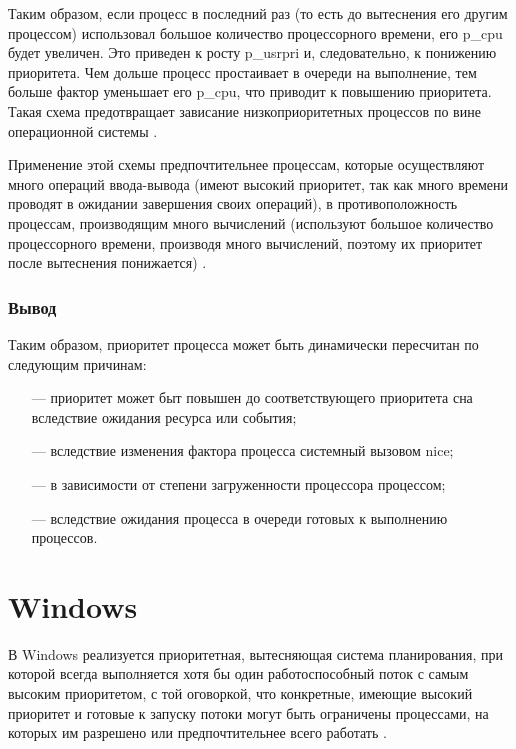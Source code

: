 Таким образом, если процесс в последний раз (то есть до вытеснения его другим процессом) использовал большое количество процессорного времени, его {\ttfamily p\_cpu} будет увеличен. Это приведен к росту {\ttfamily p\_usrpri} и, следовательно, к понижению приоритета. Чем дольше процесс простаивает в очереди на выполнение, тем больше фактор  уменьшает его {\ttfamily p\_cpu}, что приводит к повышению приоритета. Такая схема предотвращает зависание низкоприоритетных процессов по вине операционной системы \cite{unix5}.

Применение этой схемы предпочтительнее процессам, которые осуществляют много операций ввода-вывода (имеют высокий приоритет, так как много времени проводят в ожидании завершения своих операций), в противоположность процессам, производящим много вычислений (используют большое количество процессорного времени, производя много вычислений, поэтому их приоритет после вытеснения понижается) \cite{unix5}.

\subsubsection*{Вывод}

Таким образом, приоритет процесса может быть динамически пересчитан по следующим причинам:

\begin{itemize}
    \item[---] приоритет может быт повышен до соответствующего приоритета сна вследствие ожидания ресурса или события;
    \item[---] вследствие изменения фактора  процесса системный вызовом {\ttfamily nice};
    \item[---] в зависимости от степени загруженности процессора процессом;
    \item[---] вследствие ожидания процесса в очереди готовых к выполнению процессов.
\end{itemize}



\section{Windows}

В Windows реализуется приоритетная, вытесняющая система планирования, при которой всегда выполняется хотя бы один работоспособный поток с самым высоким приоритетом, с той оговоркой, что конкретные, имеющие высокий приоритет и готовые к запуску потоки могут быть ограничены процессами, на которых им разрешено или предпочтительнее всего работать \cite{win6}. 

